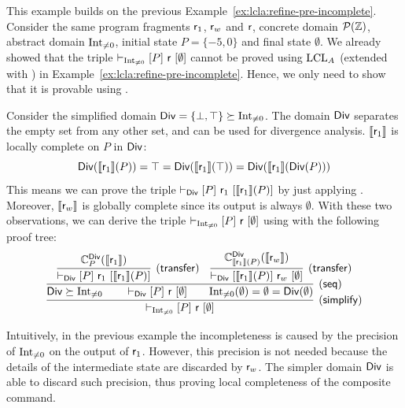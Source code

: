 \begin{example}\label{ex:lcla:simplify-stronger}
	This example builds on the previous Example~\ref{ex:lcla:refine-pre-incomplete}.
	Consider the same program fragments $\mathsf{r}_1$, $\mathsf{r}_w$ and $\mathsf{r}$, concrete domain $\mathcal{P}(\mathbb{Z})$, abstract domain $\text{Int}_{\neq 0}$, initial state $P = \{ -5, 0 \}$ and final state $\emptyset$.
	We already showed that the triple $\vdash_{\text{Int}_{\neq 0}}\nobreak[P]~\mathsf{r}~[\emptyset]$ cannot be proved using $\text{LCL}_A$ (extended with ) in Example~\ref{ex:lcla:refine-pre-incomplete}. Hence, we only need to show that it is provable using .

	Consider the simplified domain $\mathsf{Div} = \{ \bot, \top \} \succeq \text{Int}_{\neq 0}$.
	The domain $\mathsf{Div}$ separates the empty set from any other set, and can be used for divergence analysis.
	$\llbracket\mathsf{r}_1\rrbracket$ is locally complete on $P$ in $\mathsf{Div}$:
	\begin{equation*}
		\mathsf{Div}(\llbracket\mathsf{r}_1\rrbracket(P)) = \top = \mathsf{Div}(\llbracket\mathsf{r}_1\rrbracket(\top)) = \mathsf{Div}(\llbracket\mathsf{r}_1\rrbracket(\mathsf{Div}(P)))
	\end{equation*}
	This means we can prove the triple $\vdash_{\mathsf{Div}}\nobreak[P]~\mathsf{r}_1~[ \llbracket\mathsf{r}_1\rrbracket(P) ]$ by just applying . Moreover, $\llbracket\mathsf{r}_w\rrbracket$ is globally complete since its output is always $\emptyset$. With these two observations, we can derive the triple $\vdash_{\text{Int}_{\neq 0}}\nobreak[P]~\mathsf{r}~[\emptyset]$ using  with the following proof tree:
	\[
	\infer[(\mathsf{simplify})]
	{ \lcl{\Int_{\neq 0}}{P}{\regr}{\emptyset} }
	{
		\infer[(\mathsf{seq})]
		{
			\Div \succeq \Int_{\neq 0}
			\qquad \lcl{\Div}{P}{\regr}{\emptyset}
			\qquad \Int_{\neq 0}(\emptyset) = \emptyset = \Div(\emptyset)
		}
		{
			\infer[(\mathsf{transfer})]
			{ \lcl{\Div}{P}{\regr_1}{\denot{\regr_1}(P)} }
			{ \complete{\Div}{P}{\denot{\regr_1}} }
			&
			\infer[(\mathsf{transfer})]
			{ \lcl{\Div}{\denot{\regr_1}(P)}{\regr_w}{\emptyset} }
			{ \complete{\Div}{\denot{\regr_1}(P)}{\denot{\regr_w}} }
		}
	}
	\]
\end{example}

Intuitively, in the previous example the incompleteness is caused by the precision of $\text{Int}_{\neq 0}$ on the output of $\mathsf{r}_1$. However, this precision is not needed because the details of the intermediate state are discarded by $\mathsf{r}_w$. The simpler domain $\mathsf{Div}$ is able to discard such precision, thus proving local completeness of the composite command.

